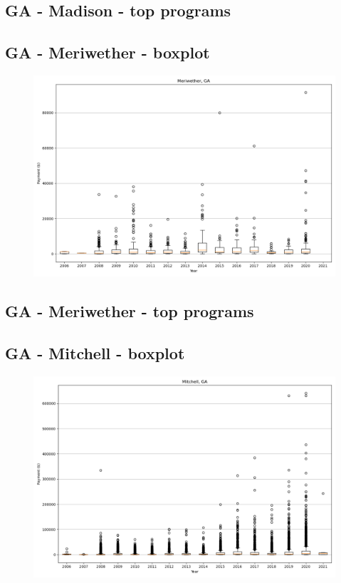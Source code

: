 \subsection*{GA - Madison - top programs}

\newpage
\subsection*{GA - Meriwether - boxplot}
\begin{figure}[h]
\centering
\includegraphics[width=7in]{../output/boxplots/counties/Meriwether-GA_boxplot.png}
\end{figure}


\subsection*{GA - Meriwether - top programs}

\newpage
\subsection*{GA - Mitchell - boxplot}
\begin{figure}[h]
\centering
\includegraphics[width=7in]{../output/boxplots/counties/Mitchell-GA_boxplot.png}
\end{figure}


